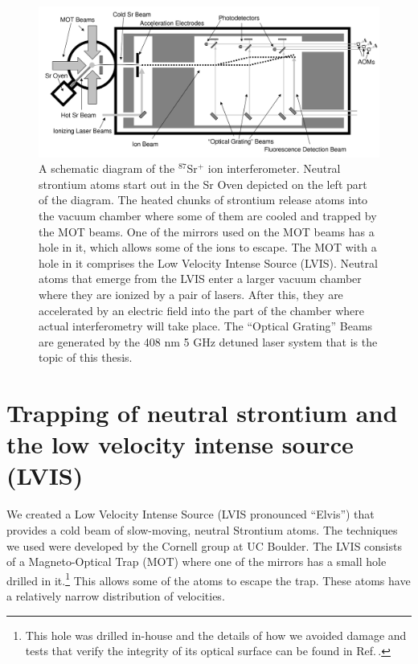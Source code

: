 \begin{figure}
\centerline{
\includegraphics[totalheight=0.3\textheight]{interferometer_diagram}
}
\caption[Ion interferometer]{\label{fig:IonInterferometer}
A schematic diagram of the $^{87}$Sr$^+$ ion interferometer. Neutral strontium atoms start out in the Sr Oven depicted on the left part of the diagram. The heated chunks of strontium release atoms into the vacuum chamber where some of them are cooled and trapped by the MOT beams. One of the mirrors used on the MOT beams has a hole in it, which allows some of the ions to escape. The MOT with a hole in it comprises the Low Velocity Intense Source (LVIS). Neutral atoms that emerge from the LVIS enter a larger vacuum chamber where they are ionized by a pair of lasers. After this, they are accelerated by an electric field into the part of the chamber where actual interferometry will take place. The ``Optical Grating'' Beams are generated by the 408 nm 5 GHz detuned laser system that is the topic of this thesis.} 
\end{figure}

\section{Trapping of neutral strontium and the low velocity intense source (LVIS)}

We created a Low Velocity Intense Source (LVIS pronounced ``Elvis'') \cite{cjeDiss} that provides a cold beam of slow-moving, neutral Strontium atoms. The techniques we used were developed by the Cornell group at UC Boulder\cite{LVIS}. The LVIS consists of a Magneto-Optical Trap (MOT) where one of the mirrors has a small hole drilled in it.\footnote{This hole was drilled in-house and the details of how we avoided damage and tests that verify the integrity of its optical surface can be found in Ref.\,\cite{cjeDiss}.} This allows some of the atoms to escape the trap. These atoms have a relatively narrow distribution of velocities. %

